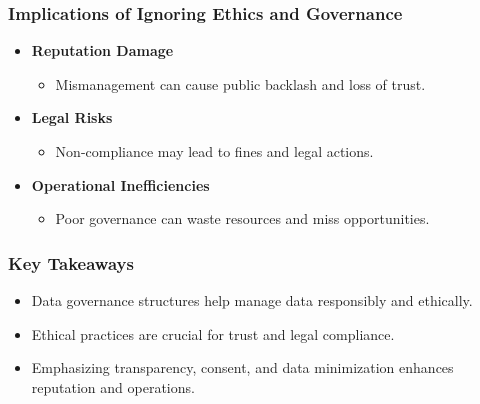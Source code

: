 \documentclass[aspectratio=169]{beamer}
\begin{document}
\begin{frame}[fragile]
    \frametitle{Implications of Ignoring Ethics and Governance}
    \begin{itemize}
        \item \textbf{Reputation Damage}
        \begin{itemize}
            \item Mismanagement can cause public backlash and loss of trust.
        \end{itemize}

        \item \textbf{Legal Risks}
        \begin{itemize}
            \item Non-compliance may lead to fines and legal actions.
        \end{itemize}

        \item \textbf{Operational Inefficiencies}
        \begin{itemize}
            \item Poor governance can waste resources and miss opportunities.
        \end{itemize}
    \end{itemize}
\end{frame}

\begin{frame}[fragile]
    \frametitle{Key Takeaways}
    \begin{itemize}
        \item Data governance structures help manage data responsibly and ethically.
        \item Ethical practices are crucial for trust and legal compliance.
        \item Emphasizing transparency, consent, and data minimization enhances reputation and operations.
    \end{itemize}
\end{frame}
\end{document}
